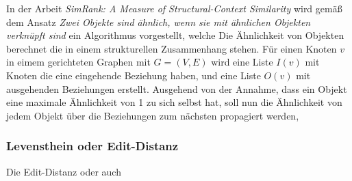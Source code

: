 In der Arbeit \textit{SimRank: A Measure of Structural-Context Similarity} wird gemäß dem Ansatz \textit{Zwei Objekte sind ähnlich, wenn sie mit ähnlichen Objekten verknüpft sind} ein Algorithmus vorgestellt, welche Die Ähnlichkeit von Objekten berechnet die in einem strukturellen Zusammenhang stehen. Für einen Knoten $v$ in eimem gerichteten Graphen mit $G = (V,E) $ wird eine Liste $I(v)$ mit Knoten die eine eingehende Beziehung haben, und eine Liste $O(v)$ mit ausgehenden Beziehungen erstellt. Ausgehend von der Annahme, dass ein Objekt eine maximale Ähnlichkeit von 1 zu sich selbst hat, soll nun die Ähnlichkeit von jedem Objekt über die Beziehungen zum nächsten propagiert werden, 	

\subsubsection{Levensthein oder Edit-Distanz}

Die Edit-Distanz oder auch 


